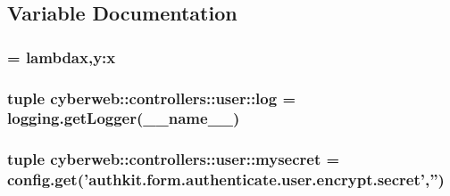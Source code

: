 \subsection{\-Variable \-Documentation}
\hypertarget{namespacecyberweb_1_1controllers_1_1user_a2b687ae0d548d3432685918ff4583f6a}{
\subsubsection[{encrypt}]{ = lambdax,y\-:x}}\label{namespacecyberweb_1_1controllers_1_1user_a2b687ae0d548d3432685918ff4583f6a}
\hypertarget{namespacecyberweb_1_1controllers_1_1user_a5eb124412094c300e54ce37c79914723}{
\subsubsection[{log}]{\setlength{\rightskip}{0pt plus 5cm}tuple {\bf cyberweb\-::controllers\-::user\-::log} = logging.\-get\-Logger(\-\_\-\-\_\-name\-\_\-\-\_\-)}}\label{namespacecyberweb_1_1controllers_1_1user_a5eb124412094c300e54ce37c79914723}
\hypertarget{namespacecyberweb_1_1controllers_1_1user_aae63d8d481cd98e40f2f5928ad79bacb}{
\subsubsection[{mysecret}]{\setlength{\rightskip}{0pt plus 5cm}tuple {\bf cyberweb\-::controllers\-::user\-::mysecret} = config.\-get('authkit.\-form.\-authenticate.\-user.\-encrypt.\-secret','')}}\label{namespacecyberweb_1_1controllers_1_1user_aae63d8d481cd98e40f2f5928ad79bacb}
